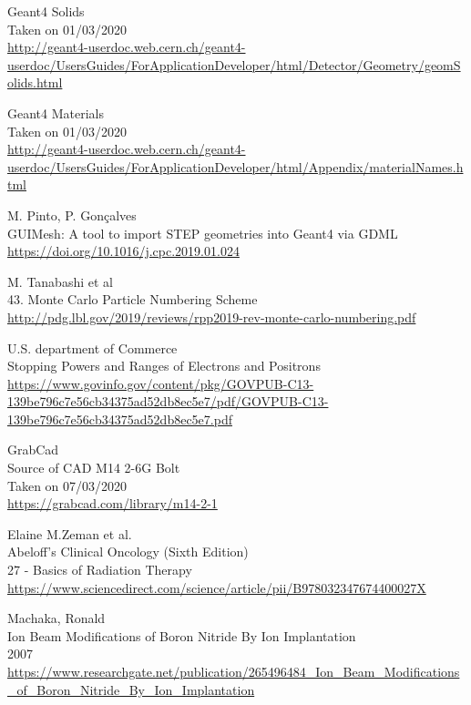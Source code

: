 \documentclass[12pt,a4paper]{article}
\begin{document}
\begin{thebibliography}{1}
	Geant4 Solids\\
	Taken on 01/03/2020\\
	\url{http://geant4-userdoc.web.cern.ch/geant4-userdoc/UsersGuides/ForApplicationDeveloper/html/Detector/Geometry/geomSolids.html}
	
	Geant4 Materials\\
	Taken on 01/03/2020\\
	\url{http://geant4-userdoc.web.cern.ch/geant4-userdoc/UsersGuides/ForApplicationDeveloper/html/Appendix/materialNames.html}
	
	M. Pinto, P. Gon\c{c}alves\\
	GUIMesh: A tool to import STEP geometries into Geant4 via GDML\\
	\url{https://doi.org/10.1016/j.cpc.2019.01.024}
		
	M. Tanabashi et al\\
	43. Monte Carlo Particle Numbering Scheme\\
	\url{http://pdg.lbl.gov/2019/reviews/rpp2019-rev-monte-carlo-numbering.pdf}
	
	U.S. department of Commerce\\
	Stopping Powers and Ranges of
	Electrons and Positrons\\
	\url{https://www.govinfo.gov/content/pkg/GOVPUB-C13-139be796c7e56cb34375ad52db8ec5e7/pdf/GOVPUB-C13-139be796c7e56cb34375ad52db8ec5e7.pdf}
	
	GrabCad\\
	Source of CAD M14 2-6G Bolt\\
	Taken on 07/03/2020\\
	\url{https://grabcad.com/library/m14-2-1}

	Elaine M.Zeman et al.\\
	Abeloff's Clinical Oncology (Sixth Edition)\\
	27 - Basics of Radiation Therapy\\
	\url{https://www.sciencedirect.com/science/article/pii/B978032347674400027X}
	
	Machaka, Ronald\\
	Ion Beam Modifications of Boron Nitride By Ion Implantation\\
	2007\\
	\url{https://www.researchgate.net/publication/265496484_Ion_Beam_Modifications_of_Boron_Nitride_By_Ion_Implantation}
\end{thebibliography}
\end{document}
